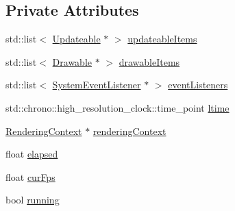 \subsection*{Private Attributes}
\begin{DoxyCompactItemize}
\item 
std\+::list$<$ \hyperlink{classZeta_1_1Updateable}{Updateable} $\ast$ $>$ \hyperlink{classZeta_1_1GeneralLoop_af765b95f83aad985b7d056d154335db9}{updateable\+Items}
\item 
std\+::list$<$ \hyperlink{classZeta_1_1Drawable}{Drawable} $\ast$ $>$ \hyperlink{classZeta_1_1GeneralLoop_a20d3c4bcc87b4885636e29efd45b196e}{drawable\+Items}
\item 
std\+::list$<$ \hyperlink{classZeta_1_1SystemEventListener}{System\+Event\+Listener} $\ast$ $>$ \hyperlink{classZeta_1_1GeneralLoop_a30eda9d355645737c2c4bd8e30f9eb43}{event\+Listeners}
\item 
std\+::chrono\+::high\+\_\+resolution\+\_\+clock\+::time\+\_\+point \hyperlink{classZeta_1_1GeneralLoop_a885569a048470ed6451c1d7e95e56df5}{ltime}
\item 
\hyperlink{classZeta_1_1RenderingContext}{Rendering\+Context} $\ast$ \hyperlink{classZeta_1_1GeneralLoop_ac9c60e031a0455d332294c2f38098ad0}{rendering\+Context}
\item 
float \hyperlink{classZeta_1_1GeneralLoop_a3f81a307d14ee0944a74c4e1fc9737a4}{elapsed}
\item 
float \hyperlink{classZeta_1_1GeneralLoop_a4d4c7e4a92bc9ec7d3cc0a75a0dd7371}{cur\+Fps}
\item 
bool \hyperlink{classZeta_1_1GeneralLoop_acf550e56f0fddfcd5f9a5cb35ba036e3}{running}
\end{DoxyCompactItemize}


